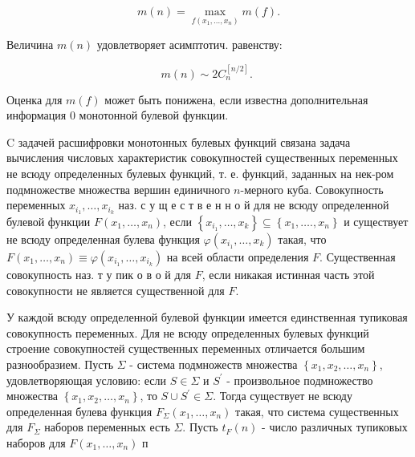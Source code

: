 \documentclass[10pt]{article}
\begin{document}
\[

m(n)=\underset{f\left(x_{1}, \ldots, x_{n}\right)}{\max } m(f) .

\]



Величина $m(n)$ удовлетворяет асимптотич. равенству:



\[

m(n) \sim 2 C_{n}^{[n / 2]} \text {. }

\]



Оценка для $m(f)$ может быть понижена, если известна дополнительная информация 0 монотонной булевой функции.



C задачей расшифровки монотонных булевых функций связана задача вычисления числовых характеристик совокупностей существенных переменных не всюду определенных булевых функций, т. е. функций, заданных на нек-ром подмножестве множества вершин единичного $n$-мерного куба. Совокупность переменных $x_{i_{1}}, \ldots, x_{i_{k}}$ наз. с у щ е с т в е н н о й для не всюду определенной булевой функции $F\left(x_{1}, \ldots, x_{n}\right)$, если $\left\{x_{i_{1}}, \ldots, x_{k}\right\} \subseteq\left\{x_{1}, \ldots ., x_{n}\right\}$ и существует не всюду определенная булева функция $\varphi\left(x_{i_{1}}, \ldots, x_{k}\right)$ такая, что $F\left(x_{1}, \ldots, x_{n}\right) \equiv \varphi\left(x_{i_{1}}, \ldots, x_{i_{k}}\right)$ на всей области определения $F$. Существенная совокупность наз. т у пик о в о й для $F$, если никакая истинная часть этой совокупности не является существенной для $F$.



У каждой всюду определенной булевой функции имеется единственная тупиковая совокупность переменных. Для не всюду определенных булевых функций строение совокупностей существенных переменных отличается большим разнообразием. Пусть $\Sigma$ - система подмножеств множества $\left\{x_{1}, x_{2}, \ldots, x_{n}\right\}$, удовлетворяющая условию: если $S \in \Sigma$ и $S^{\prime}$ - произвольное подмножество множества $\left\{x_{1}, x_{2}, \ldots, x_{n}\right\}$, то $S \cup S^{\prime} \in \Sigma$. Тогда существует не всюду определенная булева функция $F_{\Sigma}\left(x_{1}, \ldots, x_{n}\right)$ такая, что система существенных для $F_{\Sigma}$ наборов переменных есть $\Sigma$. Пусть $t_{F}(n)$ - число различных тупиковых наборов для $F\left(x_{1}, \ldots, x_{n}\right)$ п
\end{document}

